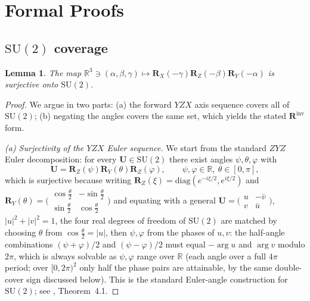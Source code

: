 \documentclass[11pt]{article}
\newcommand{\SU}{\mathrm{SU}}
\newcommand{\bbR}{\mathbb{R}}
\newtheorem{lemma}[theorem]{Lemma}
\theoremstyle{plain}
\theoremstyle{plain}
\begin{document}
\section{Formal Proofs}\label{app:proofs}
\subsection{$\SU(2)$ coverage}\label{app:su2}
\begin{lemma}\label{lem:su2_cover}
  The map $\bbR^3\ni(\alpha,\beta,\gamma)\mapsto
  \mathbf{R}_X(-\gamma) \mathbf{R}_Z(-\beta) \mathbf{R}_Y(-\alpha)$ is surjective onto $\SU(2)$.
\end{lemma}
\begin{proof}
We argue in two parts: (a) the forward $Y ZX$ axis sequence covers all
of $\SU(2)$; (b) negating the angles
covers the same set, which yields the stated $\mathbf{R}^{\mathrm{inv}}$ form.

\emph{(a) Surjectivity of the $Y ZX$ Euler sequence.}
We start from the standard $ZY Z$ Euler decomposition: for every
$\mathbf{U}\in\SU(2)$ there exist angles $\psi,\theta,\varphi$ with
\begin{equation}\label{eq:zyz}
  \mathbf{U} = \mathbf{R}_Z(\psi) \mathbf{R}_Y(\theta) \mathbf{R}_Z(\varphi),
  \qquad \psi,\varphi\in\bbR,\ \theta\in[0,\pi],
\end{equation}
which is surjective because writing
$\mathbf{R}_Z(\xi)=\mathrm{diag}(e^{-i\xi/2},e^{i\xi/2})$ and
$\mathbf{R}_Y(\theta)=\bigl(\begin{smallmatrix}
\cos\frac\theta2 & -\sin\frac\theta2\\
\sin\frac\theta2 & \cos\frac\theta2\end{smallmatrix}\bigr)$
and equating with a general
$\mathbf{U}=\bigl(\begin{smallmatrix} u & -\bar v\\ v & \bar u
\end{smallmatrix}\bigr)$, $|u|^2+|v|^2=1$, the four real degrees of
freedom of $\SU(2)$ are matched by choosing $\theta$ from
$\cos\frac\theta2=|u|$, then $\psi,\varphi$ from the phases of $u,v$:
the half-angle combinations $(\psi{+}\varphi)/2$ and
$(\psi{-}\varphi)/2$ must equal $-\arg u$ and $\arg v$ modulo $2\pi$,
which is always solvable as $\psi,\varphi$ range over $\bbR$ (each
angle over a full $4\pi$ period; over $[0,2\pi)^2$ only half the phase
pairs are attainable, by the same double-cover sign discussed below). This is the standard Euler-angle construction for
$\SU(2)$; see \cite{nielsen2010quantum}, Theorem~4.1.


\end{proof}
\end{document}
